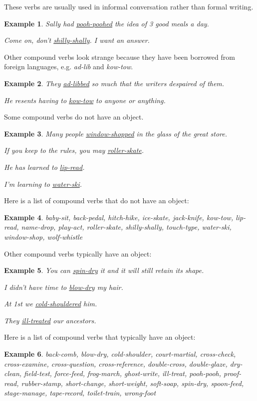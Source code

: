 \documentclass[oneside]{book}
\numberwithin{equation}{section}
\newtheorem{example}{Example}[section]
\begin{document}
These verbs are usually used in informal conversation rather than formal writing.
\begin{example}
    Sally had \underline{pooh-poohed} the idea of 3 good meals a day.
    
    Come on, don't \underline{shilly-shally}. I want an answer.
\end{example}
Other compound verbs look strange because they have been borrowed from foreign languages, e.g. \textit{ad-lib} and \textit{kow-tow}.
\begin{example}
    They \underline{ad-libbed} so much that the writers despaired of them.
    
    He resents having to \underline{kow-tow} to anyone or anything.
\end{example}
%
\noindent{} Some compound verbs do not have an object.
\begin{example}
    Many people \underline{window-shopped} in the glass of the great store.
    
    If you keep to the rules, you may \underline{roller-skate}.
    
    He has learned to \underline{lip-read}.
    
    I'm learning to \underline{water-ski}.
\end{example}
Here is a list of compound verbs that do not have an object:
\begin{example}
    baby-sit, back-pedal, hitch-hike, ice-skate, jack-knife, kow-tow, lip-read, name-drop, play-act, roller-skate, shilly-shally, touch-type, water-ski, window-shop, wolf-whistle
\end{example}
%
\noindent{} Other compound verbs typically have an object:
\begin{example}
    You can \underline{spin-dry} it and it will still retain its shape.
    
    I didn't have time to \underline{blow-dry} my hair.
    
    At 1st we \underline{cold-shouldered} him.
    
    They \underline{ill-treated} our ancestors.
\end{example}
Here is a list of compound verbs that typically have an object:
\begin{example}
    back-comb, blow-dry, cold-shoulder, court-martial, cross-check, cross-examine, cross-question, cross-reference, double-cross, double-glaze, dry-clean, field-test, force-feed, frog-march, ghost-write, ill-treat, pooh-pooh, proof-read, rubber-stamp, short-change, short-weight, soft-soap, spin-dry, spoon-feed, stage-manage, tape-record, toilet-train, wrong-foot
\end{example}
\end{document}
